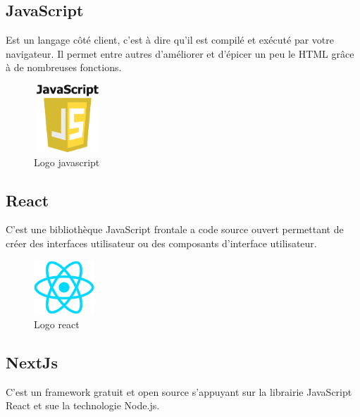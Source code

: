 \documentclass[12pt]{report}
\begin{document}
\subsection{JavaScript}
\vspace{0.1in}
\hspace*{0.16in}
Est un langage côté client, c'est à dire qu'il est compilé et exécuté par votre navigateur. Il permet entre autres d’améliorer et d'épicer un peu le HTML grâce à de nombreuses fonctions.

\vspace{0.2in}

\begin{figure}[H]
\centering
    \includegraphics[width = 1in, height = 1in]{../images/javascript.png}
\caption{Logo javascript}
\end{figure}

\newpage

\subsection{React}
\vspace{0.1in}
\hspace*{0.16in}
C’est une bibliothèque JavaScript frontale a code source ouvert permettant de créer des interfaces utilisateur ou des composants d’interface utilisateur.

\vspace{0.1in}

\begin{figure}[h]
\centering
    \includegraphics[width = 0.9in, height = 0.8in]{../images/react.png}
\caption{Logo react}
\end{figure}

\subsection{NextJs}
\vspace{0.1in}
\hspace*{0.16in}
C’est un framework gratuit et open source s’appuyant sur la librairie JavaScript React et sue la technologie Node.js.
\end{document}
